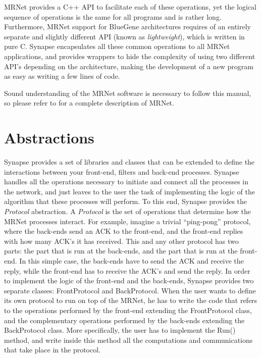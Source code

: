 \documentclass[twoside,a4,english,11pt]{book}
\begin{document}
MRNet provides a C++ API to facilitate each of these operations, yet the logical sequence of operations
is the same for all programs and is rather long. Furthermore, MRNet support for BlueGene architectures
requires of an entirely separate and slightly different API (known as \emph{lightweight}), which is written 
in pure C. Synapse encapsulates all these common operations to all MRNet applications, and provides wrappers 
to hide the complexity of using two different API's depending on the architecture, making the development of 
a new program as easy as writing a few lines of code.

Sound understanding of the MRNet software is necessary to follow this manual, so please refer to \cite{MRNetUG} 
for a complete description of MRNet.


\chapter{Abstractions}

Synapse provides a set of libraries and classes that can be extended to define the interactions between your 
front-end, filters and back-end processes. Synapse handles all the operations necessary to initiate and 
connect all the processes in the network, and just leaves to the user the task of implementing the 
logic of the algorithm that these processes will perform. To this end, Synapse provides the \emph{Protocol} 
abstraction. A \emph{Protocol} is the set of operations that determine how the MRNet processes interact. 
For example, imagine a trivial ``ping-pong'' protocol, where the back-ends send an ACK to the front-end,
and the front-end replies with how many ACK's it has received. This and any other protocol has two parts:
the part that is run at the back-ends, and the part that is run at the front-end. In this simple case,
the back-ends have to send the ACK and receive the reply, while the front-end has to receive the ACK's 
and send the reply. In order to implement the logic of the front-end and the back-ends, Synapse provides
two separate classes: FrontProtocol and BackProtocol. When the user wants to define its own protocol to 
run on top of the MRNet, he has to write the code that refers to the operations performed by the front-end
extending the FrontProtocol class, and the complementary operations performed by the back-ends extending the 
BackProtocol class. More specifically, the user has to implement the Run() method, and write inside this 
method all the computations and communications that take place in the protocol.
\end{document}
